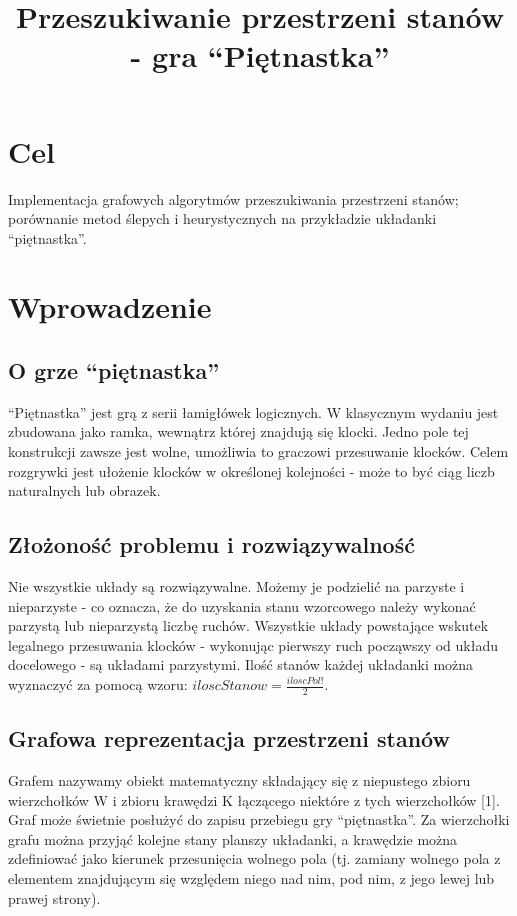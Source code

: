 \documentclass{classrep}
\author{
  \studentinfo{Marcin Pajkowski}{211968} \and
  \studentinfo{Rafał Warda}{214067}
}
\title{Przeszukiwanie przestrzeni stanów - gra ``Piętnastka''}
\begin{document}
\begin{titlepage}
  \maketitle
  \thispagestyle{empty}
\end{titlepage}

\section{Cel}

Implementacja grafowych algorytmów przeszukiwania przestrzeni stanów;
porównanie metod ślepych i heurystycznych na przykładzie układanki
``piętnastka''.

\section{Wprowadzenie}

\subsection{O grze ``piętnastka''}

``Piętnastka'' jest grą z serii łamigłówek logicznych. W klasycznym wydaniu
jest zbudowana jako ramka, wewnątrz której znajdują się klocki. Jedno pole
tej konstrukcji zawsze jest wolne, umożliwia to graczowi przesuwanie klocków.
Celem rozgrywki jest ułożenie klocków w określonej kolejności - może to być
ciąg liczb naturalnych lub obrazek.

\subsection{Złożoność problemu i rozwiązywalność}

Nie wszystkie układy są rozwiązywalne. Możemy je podzielić na parzyste i nieparzyste - co
oznacza, że do uzyskania stanu wzorcowego należy wykonać parzystą lub
nieparzystą liczbę ruchów. Wszystkie układy powstające wskutek legalnego
przesuwania klocków - wykonując pierwszy ruch począwszy od układu docelowego - są układami parzystymi.
 Ilość stanów każdej układanki można wyznaczyć za pomocą wzoru:
$ iloscStanow = \frac{iloscPol!}2 $.

\subsection{Grafowa reprezentacja przestrzeni stanów}

Grafem nazywamy obiekt matematyczny składający się z niepustego zbioru
wierzchołków W i zbioru krawędzi K łączącego niektóre z tych
wierzchołków {[}1{]}. Graf może świetnie posłużyć do zapisu przebiegu
gry ``piętnastka''. Za wierzchołki grafu można przyjąć kolejne stany
planszy układanki, a krawędzie można zdefiniować jako kierunek
przesunięcia wolnego pola (tj. zamiany wolnego pola z elementem
znajdującym się względem niego nad nim, pod nim, z jego lewej lub prawej
strony).
\end{document}
